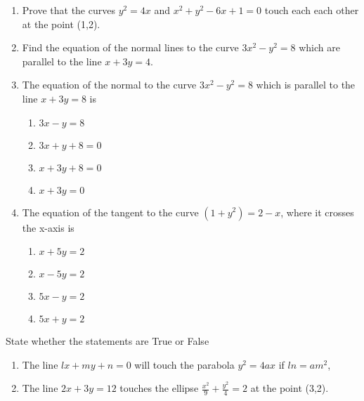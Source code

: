 \begin{enumerate}[label=\thesubsection.\arabic*,ref=\thesubsection.\theenumi]
\item Prove that the curves $y^2=4x$ and $x^2+y^2-6x+1=0$ touch each each other at the point (1,2).
\item Find the equation of the normal lines to the curve $3x^2-y^2=8$ which are parallel to the line $x+3y=4$.
 \item The equation of the normal to the curve $3x^2-y^2 =8$ which is parallel to the line $x+3y=8$ is
 \begin{enumerate}
 \item $3x-y=8$
 \item $3x+y+8=0$
 \item $x+3y+8=0$
 \item $x+3y=0$
 \end{enumerate}
\item The equation of the tangent to the curve $(1+y^2) =2-x$, where it crosses the x-axis is 
\begin{enumerate}
\item $x+5y=2$
\item $x-5y=2$
\item $5x-y=2$
\item $5x+y=2$
\end{enumerate}
\end{enumerate}
State whether the statements are True or False 
\begin{enumerate}[label=\thesection.\arabic*,ref=\thesection.\theenumi,resume*]
\item The line $lx+my+n=0$ will touch the parabola $y^2=4 ax$ if $ln =am^2$,
\item The line $2x+3y=12$ touches the ellipse $\frac{x^2}{9}+\frac{y^2}{4}=2$ at the point (3,2).
\end{enumerate}
